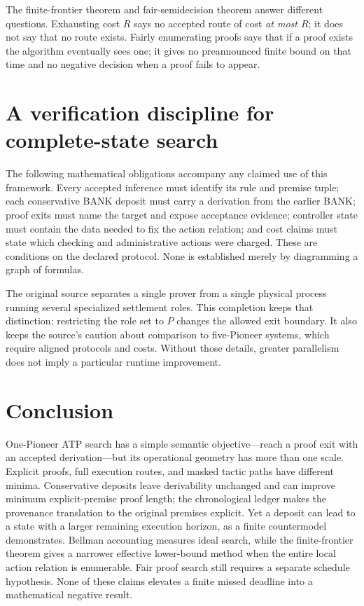 \documentclass[11pt,letterpaper]{article}
\theoremstyle{definition}
\theoremstyle{remark}
\begin{document}
The finite-frontier theorem and fair-semidecision theorem answer different questions. Exhausting cost $R$ says no accepted route of cost \emph{at most $R$}; it does not say that no route exists. Fairly enumerating proofs says that if a proof exists the algorithm eventually sees one; it gives no preannounced finite bound on that time and no negative decision when a proof fails to appear.

\section{A verification discipline for complete-state search}
The following mathematical obligations accompany any claimed use of this framework. Every accepted inference must identify its rule and premise tuple; each conservative BANK deposit must carry a derivation from the earlier BANK; proof exits must name the target and expose acceptance evidence; controller state must contain the data needed to fix the action relation; and cost claims must state which checking and administrative actions were charged. These are conditions on the declared protocol. None is established merely by diagramming a graph of formulas.

The original source separates a single prover from a single physical process running several specialized settlement roles. This completion keeps that distinction: restricting the role set to $P$ changes the allowed exit boundary. It also keeps the source's caution about comparison to five-Pioneer systems, which require aligned protocols and costs. Without those details, greater parallelism does not imply a particular runtime improvement.

\section{Conclusion}
One-Pioneer ATP search has a simple semantic objective---reach a proof exit with an accepted derivation---but its operational geometry has more than one scale. Explicit proofs, full execution routes, and masked tactic paths have different minima. Conservative deposits leave derivability unchanged and can improve minimum explicit-premise proof length; the chronological ledger makes the provenance translation to the original premises explicit. Yet a deposit can lead to a state with a larger remaining execution horizon, as a finite countermodel demonstrates. Bellman accounting measures ideal search, while the finite-frontier theorem gives a narrower effective lower-bound method when the entire local action relation is enumerable. Fair proof search still requires a separate schedule hypothesis. None of these claims elevates a finite missed deadline into a mathematical negative result.
\end{document}
